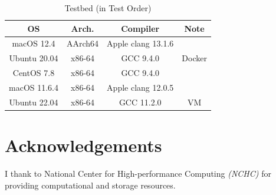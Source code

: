 \documentclass[12pt, a4paper]{article}
\begin{document}
\begin{table}[htp]
\caption{Testbed (in Test Order)}
\centering
\begin{tabular}{c|c|c|c}
OS & Arch. & Compiler & Note \\\hline
macOS 12.4 & AArch64 & Apple clang 13.1.6 \\
Ubuntu 20.04 & x86-64 & GCC 9.4.0 & Docker\footnotemark \\
CentOS 7.8 & x86-64 & GCC 9.4.0 \\
macOS 11.6.4 & x86-64 & Apple clang 12.0.5 \\
Ubuntu 22.04 & x86-64 & GCC 11.2.0 & VM \\
\end{tabular}
\label{tab:testbed}
\end{table}

\pagebreak[4]

\section*{Acknowledgements}

I thank to \textsf{National Center for High-performance Computing} \textit{(NCHC)} for providing computational and storage resources.
\end{document}
